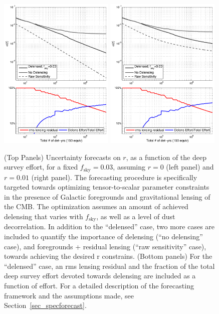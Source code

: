 \begin{figure}[!h]
\centering
\includegraphics[width=0.49\textwidth]{Inflation/sigr_effort_r0.pdf}
\includegraphics[width=0.49\textwidth]{Inflation/sigr_effort_r01.pdf}
\caption{(Top Panels)
Uncertainty forecasts on $r$, as a function of the deep survey effort, for a fixed
$f_\mathrm{sky}=0.03$, assuming $r=0$ (left panel) and $r=0.01$ (right panel).
The forecasting procedure is specifically targeted
towards optimizing tensor-to-scalar parameter constraints in the presence of 
Galactic foregrounds and gravitational lensing of the CMB. The optimization 
assumes an amount of achieved delensing that varies with $f_\mathrm{sky}$, as well as a
level of dust decorrelation. In addition to the ``delensed'' case, two more cases are
 included to quantify the importance of delensing (``no delensing'' case), and
foregrounds + residual lensing (``raw sensitivity'' case), towards achieving the
desired r constrains.
(Bottom panels)
For the ``delensed'' case, an rms lensing residual and the fraction of the total
deep survey effort devoted towards delensing are included as a function of
effort. For a detailed description of the forecasting framework and the
assumptions made, see Section~\ref{sec_specforecast}.}  
\label{fig_rforecast2}
\end{figure}


